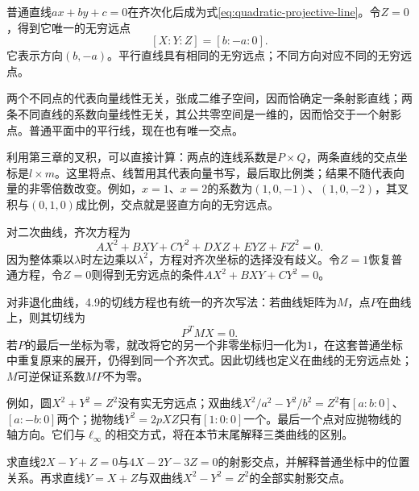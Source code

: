 普通直线\(ax+by+c=0\)在齐次化后成为式\eqref{eq:quadratic-projective-line}。令\(Z=0\)，得到它唯一的无穷远点
\begin{equation}\label{eq:quadratic-direction-at-infinity}
 [X:Y:Z]=[b:-a:0].
\end{equation}
它表示方向\((b,-a)\)。平行直线具有相同的无穷远点；不同方向对应不同的无穷远点。

两个不同点的代表向量线性无关，张成二维子空间，因而恰确定一条射影直线；两条不同直线的系数向量线性无关，其公共零空间是一维的，因而恰交于一个射影点。普通平面中的平行线，现在也有唯一交点。

利用第三章的叉积，可以直接计算：两点的连线系数是\(P\times Q\)，两条直线的交点坐标是\(l\times m\)。这里将点、线暂用其代表向量书写，最后取比例类；结果不随代表向量的非零倍数改变。例如，\(x=1\)、\(x=2\)的系数为\((1,0,-1)\)、\((1,0,-2)\)，其叉积与\((0,1,0)\)成比例，交点就是竖直方向的无穷远点。

对二次曲线，齐次方程为
\begin{equation}\label{eq:quadratic-projective-conic}
 AX^2+BXY+CY^2+DXZ+EYZ+FZ^2=0.
\end{equation}
因为整体乘以\(\lambda\)时左边乘以\(\lambda^2\)，方程对齐次坐标的选择没有歧义。令\(Z=1\)恢复普通方程，令\(Z=0\)则得到无穷远点的条件\(AX^2+BXY+CY^2=0\)。

对非退化曲线，4.9的切线方程也有统一的齐次写法：若曲线矩阵为\(M\)，点\(P\)在曲线上，则其切线为
\begin{equation}\label{eq:quadratic-projective-tangent}
 P^TMX=0.
\end{equation}
若\(P\)的最后一坐标为零，就改将它的另一个非零坐标归一化为\(1\)，在这套普通坐标中重复原来的展开，仍得到同一个齐次式。因此切线也定义在曲线的无穷远点处；\(M\)可逆保证系数\(MP\)不为零。

例如，圆\(X^2+Y^2=Z^2\)没有实无穷远点；双曲线\(X^2/a^2-Y^2/b^2=Z^2\)有\([a:b:0]\)、\([a:-b:0]\)两个；抛物线\(Y^2=2pXZ\)只有\([1:0:0]\)一个。最后一个点对应抛物线的轴方向。它们与\(\ell_\infty\)的相交方式，将在本节末尾解释三类曲线的区别。

\par\addvspace{6pt}
\noindent\begin{minipage}{\linewidth}
\begin{example}
求直线\(2X-Y+Z=0\)与\(4X-2Y-3Z=0\)的射影交点，并解释普通坐标中的位置关系。再求直线\(Y=X+Z\)与双曲线\(X^2-Y^2=Z^2\)的全部实射影交点。
\end{example}
\end{minipage}\par\addvspace{6pt}


